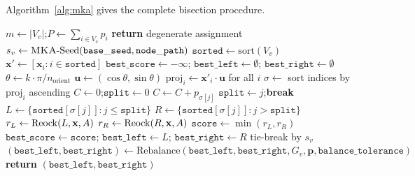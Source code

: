 Algorithm~\ref{alg:mka} gives the complete \mka{} bisection procedure.

\begin{algorithm}[t]
\caption{\mka{}-\textsc{Bisect}($G_v$, $\mathbf{x}$, $\mathbf{p}$,
  $A$, $n_{\mathrm{orient}}$, $\mathtt{base\_seed}$,
  $\mathtt{node\_path}$, $\mathtt{balance\_tolerance}$)}
\label{alg:mka}
\begin{algorithmic}[1]
\State $m \gets |V_v|$;\quad $P \gets \sum_{i \in V_v} p_i$
  \textbf{return} degenerate assignment
\EndIf
\State $s_v \gets \textsc{MKA}{}\text{-Seed}(\mathtt{base\_seed}, \mathtt{node\_path})$
\State $\mathtt{sorted} \gets \mathrm{sort}(V_v)$
\State $\mathbf{x}' \gets [\mathbf{x}_i : i \in \mathtt{sorted}]$
\State $\mathtt{best\_score} \gets -\infty$;\quad
       $\mathtt{best\_left} \gets \emptyset$;\quad
       $\mathtt{best\_right} \gets \emptyset$
  \State $\theta \gets k \cdot \pi / n_{\mathrm{orient}}$
         \Comment{angle in $[0, \pi)$}
  \State $\mathbf{u} \gets (\cos\theta, \sin\theta)$
  \State $\mathrm{proj}_i \gets \mathbf{x}'_i \cdot \mathbf{u}$ for all $i$
  \State $\sigma \gets$ sort indices by $\mathrm{proj}_i$ ascending
  \State $C \gets 0$;\quad $\mathtt{split} \gets 0$
    \State $C \gets C + p_{\sigma[j]}$
      $\mathtt{split} \gets j$;\quad \textbf{break}
    \EndIf
  \EndFor
  \State $L \gets \{\mathtt{sorted}[\sigma[j]] : j \le \mathtt{split}\}$
  \State $R \gets \{\mathtt{sorted}[\sigma[j]] : j > \mathtt{split}\}$
  \State $r_L \gets \mathrm{Reock}{}(L, \mathbf{x}, A)$
  \State $r_R \gets \mathrm{Reock}{}(R, \mathbf{x}, A)$
  \State $\mathtt{score} \gets \min(r_L, r_R)$
    \State $\mathtt{best\_score} \gets \mathtt{score}$;\quad
           $\mathtt{best\_left} \gets L$;\quad
           $\mathtt{best\_right} \gets R$
    \State tie-break by $s_v$
  \EndIf
\EndFor
\State $(\mathtt{best\_left}, \mathtt{best\_right}) \gets
       \mathrm{Rebalance}(\mathtt{best\_left}, \mathtt{best\_right},
       G_v, \mathbf{p}, \mathtt{balance\_tolerance})$
\State \textbf{return} $(\mathtt{best\_left}, \mathtt{best\_right})$
\end{algorithmic}
\end{algorithm}

